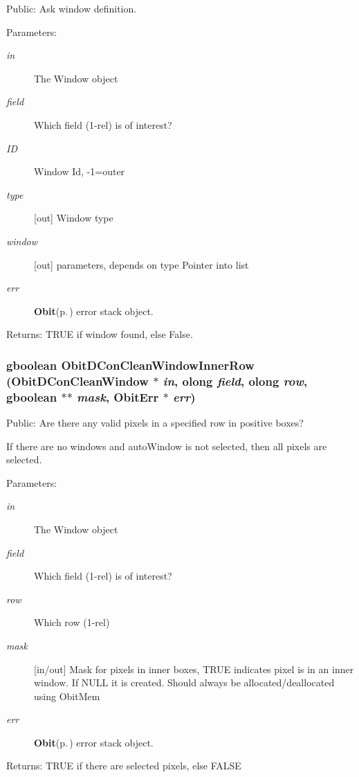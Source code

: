 Public: Ask window definition. 

\begin{Desc}
\item[Parameters:]
\begin{description}
\item[{\em in}]The Window object \item[{\em field}]Which field (1-rel) is of interest? \item[{\em ID}]Window Id, -1=outer \item[{\em type}][out] Window type \item[{\em window}][out] parameters, depends on type Pointer into list \item[{\em err}]{\bf Obit}{\rm (p.\,\pageref{structObit})} error stack object. \end{description}
\end{Desc}
\begin{Desc}
\item[Returns:]TRUE if window found, else False. \end{Desc}
\subsubsection{\setlength{\rightskip}{0pt plus 5cm}gboolean Obit\-DCon\-Clean\-Window\-Inner\-Row ({\bf Obit\-DCon\-Clean\-Window} $\ast$ {\em in}, {\bf olong} {\em field}, {\bf olong} {\em row}, gboolean $\ast$$\ast$ {\em mask}, {\bf Obit\-Err} $\ast$ {\em err})}\label{ObitDConCleanWindow_8h_a40}


Public: Are there any valid pixels in a specified row in positive boxes? 

If there are no windows and auto\-Window is not selected, then all pixels are selected. \begin{Desc}
\item[Parameters:]
\begin{description}
\item[{\em in}]The Window object \item[{\em field}]Which field (1-rel) is of interest? \item[{\em row}]Which row (1-rel) \item[{\em mask}][in/out] Mask for pixels in inner boxes, TRUE indicates pixel is in an inner window. If NULL it is created. Should always be allocated/deallocated using Obit\-Mem \item[{\em err}]{\bf Obit}{\rm (p.\,\pageref{structObit})} error stack object. \end{description}
\end{Desc}
\begin{Desc}
\item[Returns:]TRUE if there are selected pixels, else FALSE \end{Desc}
